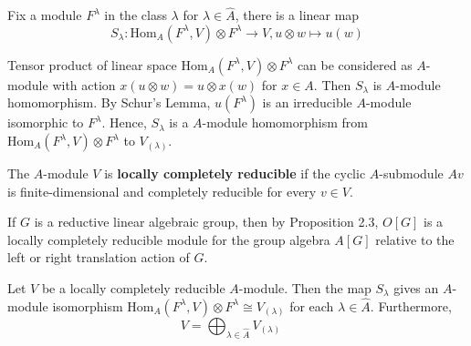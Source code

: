 \documentclass[12pt]{article}
\newenvironment{definition}[2][Definition]{\begin{trivlist}
\item[\hskip \labelsep {\bfseries #1}\hskip \labelsep {\bfseries #2.}]}{\end{trivlist}}
\newenvironment{proposition}[2][Proposition]{\begin{trivlist}
\item[\hskip \labelsep {\bfseries #1}\hskip \labelsep {\bfseries #2.}]}{\end{trivlist}}
\newenvironment{example}[2][Example]{\begin{trivlist}
\item[\hskip \labelsep {\bfseries #1}\hskip \labelsep {\bfseries #2.}]}{\end{trivlist}}
\begin{document}
    Fix a module $F^{\lambda}$ in the class $\lambda$ for $\lambda \in \widehat{A}$, there is a linear map
    $$S_{\lambda}:\mathrm{Hom}_{A}(F^{\lambda},V)\otimes F^{\lambda} \to V, u\otimes w\mapsto u(w)$$
    
    Tensor product of linear space $\mathrm{Hom}_{A}(F^{\lambda},V)\otimes F^{\lambda}$ can be considered as $A$-module with action $x(u\otimes w) = u\otimes x(w)$ for $x\in A$. Then $S_{\lambda}$ is $A$-module homomorphism. By Schur's Lemma, $u(F^{\lambda})$ is an irreducible $A$-module isomorphic to $F^{\lambda}$. Hence, $S_{\lambda}$ is a $A$-module homomorphism from $\mathrm{Hom}_{A}(F^{\lambda},V)\otimes F^{\lambda}$ to $V_{(\lambda)}$.
\begin{definition}{6.1}
    The $A$-module $V$ is \textbf{locally completely reducible} if the cyclic $A$-submodule $Av$ is finite-dimensional and completely reducible for every $v \in V$.
\end{definition}
\begin{example}{6.2}
    If $G$ is a reductive linear algebraic group, then by Proposition 2.3, $O[G]$ is a locally completely reducible module for the group algebra $A[G]$ relative to the left or right translation action of $G$.
\end{example}
\begin{proposition}{6.3}
    Let $V$ be a locally completely reducible $A$-module. Then the map $S_{\lambda}$ gives an $A$-module isomorphism $\mathrm{Hom}_{A}(F^{\lambda}, V) \otimes F^{\lambda} \cong V_{(\lambda)}$ for each $\lambda \in \widehat{A}$. Furthermore,
    $$ 
    V = \bigoplus_{\lambda \in \widehat{{A}}} V_{(\lambda)}\quad 
    $$
\end{proposition}
\end{document}
